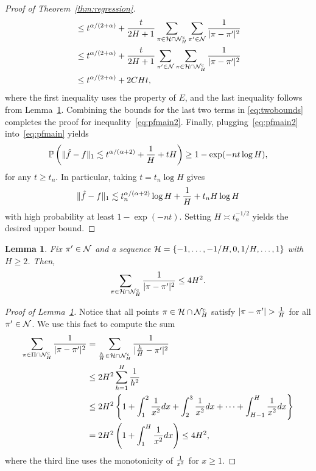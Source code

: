 \documentclass[11pt]{article}
\theoremstyle{plain}
\newtheorem{lem}{Lemma}
\theoremstyle{definition}
\begin{document}
\begin{proof}[Proof of Theorem~\ref{thm:regression}]
\begin{align}
&\leq t^{\alpha/(2+\alpha)}+{t\over 2H+1} \sum_{\pi \in \mathcal{H}\cap \mathcal{N}_H^c} \sum_{\pi' \in \mathcal{N}}{1\over |\pi-\pi'|^2}\\
&\leq  t^{\alpha/(2+\alpha)}+{t\over 2H+1} \sum_{\pi'\in \mathcal{N}} \sum_{\pi \in \mathcal{H}\cap \mathcal{N}_H^c}{1\over |\pi-\pi'|^2}\\
&\leq t^{\alpha/(2+\alpha)}+ 2CHt,
\end{align}
where the first inequality uses the property of $E$, and the last inequality follows from Lemma~\ref{lem:H}.  Combining the bounds for the last two terms in \eqref{eq:twobounds} completes the proof for inequality~\eqref{eq:pfmain2}. Finally, plugging~\eqref{eq:pfmain2} into~\eqref{eq:pfmain} yields
\[
\mathbb{P}\left(\lVert\hat f-f\rVert_1\lesssim t^{\alpha/(\alpha+2)}+{1\over H}+tH \right)\geq 1-\exp(-nt\log H),
\]
for any $t\geq t_n$. In particular, taking $t=t_n\log H$ gives
\[
\lVert\hat f-f\rVert_1\lesssim  t_n^{\alpha/(\alpha+2)}\log H+{1\over H}+t_nH\log H
\]
with high probability at least $1-\exp(-nt)$. Setting $H\asymp t^{-1/2}_n$ yields the desired upper bound.
\end{proof}

\begin{lem}\label{lem:H}
Fix $\pi'\in\mathcal{N}$ and a sequence $\mathcal{H}=\{-1,\ldots,-1/H,0,1/H,\ldots,1\}$ with $H\geq 2$. Then, 
\[
\sum_{\pi \in \mathcal{H}\cap \mathcal{N}_H^c}{1\over 
|\pi-\pi'|^2}\leq 4H^2. 
\]
\end{lem}
\begin{proof}[Proof of Lemma~\ref{lem:H}]
Notice that all points $\pi\in\mathcal{H}\cap\mathcal{N}_H^c$ satisfy $|\pi-\pi'|>{1\over H}$ for all $\pi'\in\mathcal{N}$. We use this fact to compute the sum
\begin{align}
   \sum_{\pi \in \Pi\cap \mathcal{N}_H^c}{1\over |\pi-\pi'|^2}&= \sum_{\frac{h}{H}\in\mathcal{H}\cap \mathcal{N}_H^c } {1\over |\frac{h}{H}-\pi'|^2}\\
   &\leq 2H^2\sum_{h=1}^{H}{1 \over h^2}\\
 &\leq 2H^2\left\{ 1+\int_{1}^2{1\over x^2}dx+ \int_{2}^3{1\over x^2}dx+\cdots + \int_{H-1}^H{1\over x^2}dx\right\}\\
&= 2H^2\left(1+\int^{H}_{1}{1\over x^2}dx\right) \leq 4H^2,
\end{align}
 where the third line uses the monotonicity of ${1\over x^2}$ for $x\geq 1$. 
 \end{proof}
\end{document}
